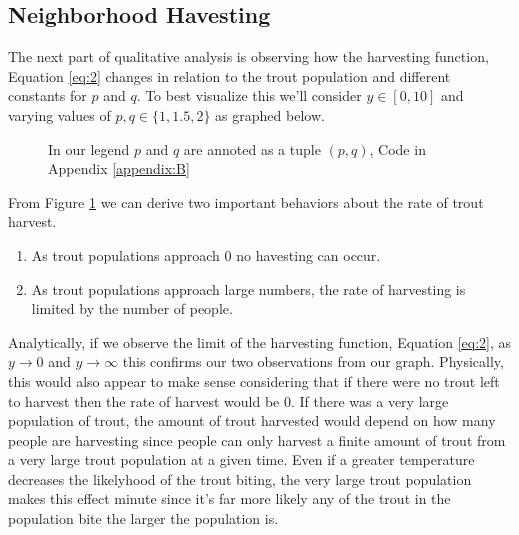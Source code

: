 \documentclass[letterpaper,12pt]{article}
\begin{document}
\subsection{Neighborhood Havesting}
The next part of qualitative analysis is observing how the harvesting function, Equation \eqref{eq:2} changes in relation to the trout population and different constants for \(p\) and \(q\).
To best visualize this we'll consider \(y \in [0,10]\) and varying values of \(p,q \in \{1, 1.5, 2\}\) as graphed below.
\newline
\begin{figure}[H]
    \centering
    
    \caption{In our legend \(p\) and \(q\) are annoted as a tuple \((p,q)\), Code in Appendix \ref{appendix:B}}
    \label{fig:2}
\end{figure}
From Figure \ref{fig:2} we can derive two important behaviors about the rate of trout harvest.
\begin{enumerate}
    \item As trout populations approach 0 no havesting can occur.
    \item As trout populations approach large numbers, the rate of harvesting is limited by the number of people.
\end{enumerate}
Analytically, if we observe the limit of the harvesting function, Equation \eqref{eq:2}, as \(y\to 0\) and \(y\to \infty\) this confirms our two observations from our graph. 
Physically, this would also appear to make sense considering that if there were no trout left to harvest then the rate of harvest would be 0. 
If there was a very large population of trout, the amount of trout harvested would depend on how many people are harvesting since people can only harvest a finite amount of trout from a very large trout population at a given time.
Even if a greater temperature decreases the likelyhood of the trout biting, the very large trout population makes this effect minute since it's far more likely any of the trout in the population bite the larger the population is.
\end{document}
